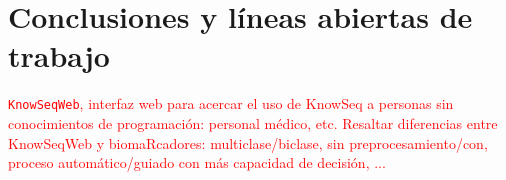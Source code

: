 \chapter{Conclusiones y líneas abiertas de trabajo}

\textcolor{red}{\texttt{KnowSeqWeb}, interfaz web para acercar el uso de KnowSeq a personas sin conocimientos de programación: personal médico, etc. Resaltar diferencias entre KnowSeqWeb y biomaRcadores: multiclase/biclase, sin preprocesamiento/con, proceso automático/guiado con más capacidad de decisión, ...}

